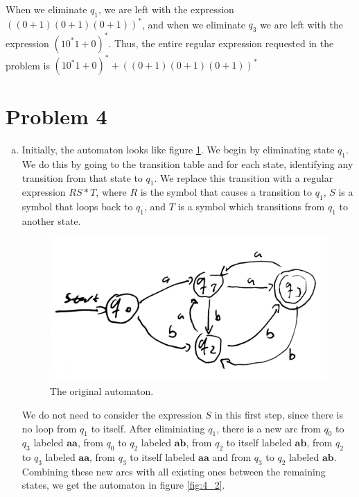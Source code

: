 \documentclass{article}
\begin{document}
When we eliminate $q_1$, we are left with the expression $((0+1)(0+1)(0+1))^*$, and when we eliminate $q_3$ we are left with the expression $(10^*1+0)^*$. Thus, the entire regular expression requested in the problem is $(10^*1+0)^* + ((0+1)(0+1)(0+1))^*$

\newpage
\section*{Problem 4}

\begin{enumerate}[(a)]
    \item 
        Initially, the automaton looks like figure \ref{fig:4_1}. We begin by eliminating state $q_1$. We do this by going to the transition table and for each state, identifying any transition from that state to $q_1$. We replace this transition with a regular expression $RS*T$, where $R$ is the symbol that causes a transition to $q_1$, $S$ is a symbol that loops back to $q_1$, and $T$ is a symbol which transitions from $q_1$ to another state. 

\begin{figure}[htpb]
    \centering
    \includegraphics[width=0.8\linewidth]{week3_4_1}
    \caption{The original automaton.}
    \label{fig:4_1}
\end{figure}

        We do not need to consider the expression $S$ in this first step, since there is no loop from $q_1$ to itself. After eliminiating $q_1$, there is a new arc from $q_0$ to $q_3$ labeled $\mathbf{aa}$, from $q_0$ to $q_2$ labeled $\mathbf{ab}$, from $q_2$ to itself labeled $\mathbf{ab}$, from $q_2$ to $q_3$ labeled $\mathbf{aa}$, from $q_3$ to itself labeled $\mathbf{aa}$ and from $q_3$ to $q_2$ labeled $\mathbf{ab}$. Combining these new arcs with all existing ones between the remaining states, we get the automaton in figure \ref{fig:4_2}.


\end{enumerate}
\end{document}
